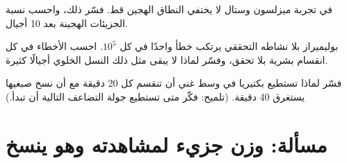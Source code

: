 \begin{exercise}[$\star\star\star$]\label{exo:g11:dna-replication:13}
في تجربة ميزلسون وستال لا يختفي النطاق الهجين قط. فسّر ذلك، واحسب نسبة
الجزيئات الهجينة بعد 10 أجيال.
\end{exercise}

\begin{exercise}[$\star\star\star$]\label{exo:g11:dna-replication:14}
بوليميراز بلا نشاطه التحققي يرتكب خطأ واحدًا في كل $10^5$. احسب
الأخطاء في كل انقسام  بشرية بلا تحقق، وفسّر لماذا لا يبقى مثل ذلك
النسل الخلوي أجيالًا كثيرة.
\end{exercise}

\begin{exercise}[$\star\star\star$]\label{exo:g11:dna-replication:15}
فسّر لماذا تستطيع بكتيريا في وسط غني أن تنقسم كل 20 دقيقة مع أن نسخ
صبغيها يستغرق 40 دقيقة. (تلميح: فكّر متى تستطيع جولة التضاعف التالية
أن تبدأ.)
\end{exercise}

\section{مسألة: وزن جزيء لمشاهدته وهو ينسخ}

